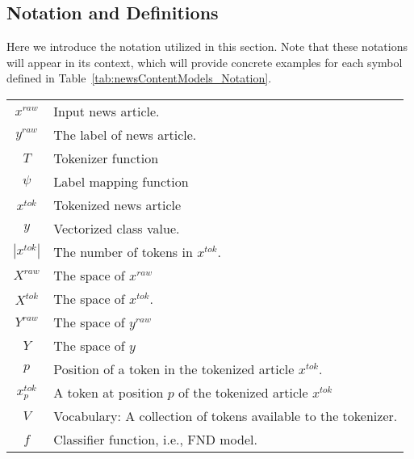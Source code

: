 \subsection{Notation and Definitions}
\label{subsec:newsContentModels_Definitions}
Here we introduce the notation utilized in this section. Note that these notations will appear in its context, which will provide concrete examples for each symbol defined in Table~\ref{tab:newsContentModels_Notation}.\\
\begin{table}
    \begin{tabular}{cp{}}
        $x^{raw}$       & Input news article.                                            \\
        $y^{raw}$       & The label of news article.                                     \\
        $T$             & Tokenizer function                                             \\
        $\psi$          & Label mapping function                                         \\
        $x^{tok}$       & Tokenized news article                                         \\
        $y$             & Vectorized class value.                                        \\
        $|x^{tok}|$     & The number of tokens in $x^{tok}$.                             \\
        $X^{raw}$       & The space of $x^{raw}$                                         \\
        $X^{tok}$       & The space of $x^{tok}$.                                        \\
        $Y^{raw}$       & The space of $y^{raw}$                                         \\
        $Y$             & The space of $y$                                               \\
        $p$             & Position of a token in the tokenized article $x^{tok}$.        \\
        $x^{tok}_p$     & A token at position $p$ of the tokenized article $x^{tok}$     \\
        $V$             & Vocabulary: A collection of tokens available to the tokenizer. \\
        $f$             & Classifier function, i.e., FND model.                          \\

\end{tabular}
\end{table}
